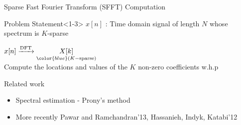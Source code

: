 

	\begin{frame}{Sparse Fast Fourier Transform (SFFT) Computation}
	
	 \begin{block}{Problem Statement}<1-3>
	 	\vspace{4pt}
	 	{\centering \alert{$x[n]$} : Time domain signal of length $N$ whose spectrum is $K$-sparse \\}
	\vspace{10pt} 	
	 	\centering	
	 	
	 {\large	$x[n]  \xrightarrow{\text{DFT}}  \underset{\color{blue}(K-\text{sparse})}{X[k]}$ \\}
	 	\vspace{10pt}
	 	Compute the {\alert{locations}} and \alert{values} of the $K$ non-zero coefficients w.h.p
	 \end{block}
	
	
	
	 {\begin{block}{Related work}
		\begin{itemize}
			\item Spectral estimation - Prony's method
			\item More recently Pawar and Ramchandran'13, Hassanieh, Indyk, Katabi'12
		\end{itemize}
	\end{block}}
	
	
	\end{frame}
